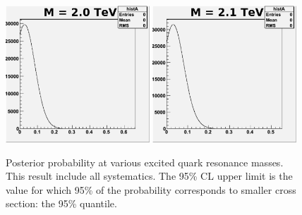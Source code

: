 \begin{figure}[!ht]
\begin{center}
     \includegraphics[width=0.48\textwidth]{Figures/MCpost2000_6_pe0.pdf}
     \includegraphics[width=0.48\textwidth]{Figures/MCpost2100_6_pe0.pdf}
 \caption{Posterior probability at
 various excited quark resonance masses.  This result include all systematics.
 The 95\% CL upper limit is the value for which 95\% of
 the probability corresponds to smaller cross section: the 95\% quantile.}
    \label{likeli2}
  \end{center}
\end{figure}

\clearpage

